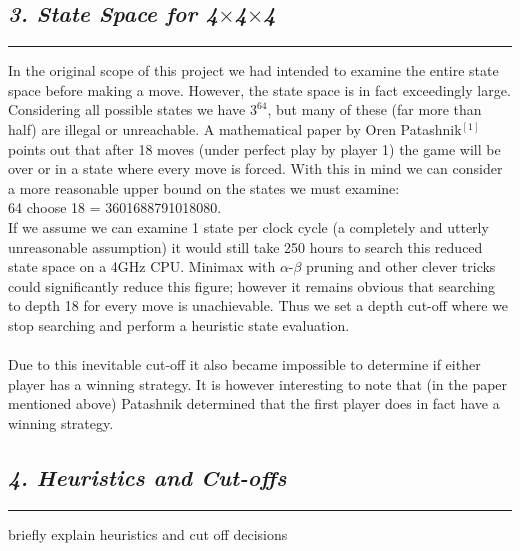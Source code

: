 \documentclass[10pt]{article}
\begin{document}
\begin{multicols}{2}
\subsection*{\emph { \textmd{3. State Space for 4$\times$4$\times$4}}}
\hrule
\vspace{0.4cm}

In the original scope of this project we had intended to examine the entire state space
before making a move. However, the state space is in fact exceedingly large. Considering all
possible states we have $3^{64}$, but many of these (far more than half) are illegal or unreachable.
A mathematical paper by Oren Patashnik$^{[1]}$ points out that after 18 moves (under perfect play by player 1)
the game will be over or in a state where every move is forced. With this in mind we can 
consider a more reasonable upper bound on the states we must examine:\\ 64 choose 18 = 3601688791018080.\\
If we assume we can examine 1 state per clock cycle (a completely and utterly unreasonable assumption) it would
still take 250 hours to search this reduced state space on a 4GHz CPU. Minimax with $\alpha$-$\beta$ pruning
and other clever tricks could significantly reduce this figure; however it remains obvious that
searching to depth 18 for every move is unachievable. Thus we set a depth cut-off where we stop
searching and perform a heuristic state evaluation.\\\\
Due to this inevitable cut-off it also became impossible to determine if either
player has a winning strategy. It is however interesting to note that (in the paper
mentioned above) Patashnik determined that the first player does in fact have 
a winning strategy. 
\pagebreak

\subsection*{\emph { \textmd{4. Heuristics and Cut-offs}}}
\hrule
\vspace{0.4cm}
briefly explain heuristics and cut off decisions\\




\end{multicols}
\end{document}
